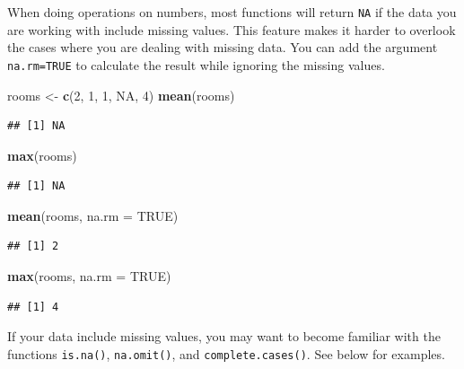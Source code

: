 \documentclass[]{book}
\newenvironment{Shaded}{\begin{snugshade}}{\end{snugshade}}
\newcommand{\KeywordTok}[1]{\textcolor[rgb]{0.13,0.29,0.53}{\textbf{#1}}}
\newcommand{\DataTypeTok}[1]{\textcolor[rgb]{0.13,0.29,0.53}{#1}}
\newcommand{\DecValTok}[1]{\textcolor[rgb]{0.00,0.00,0.81}{#1}}
\newcommand{\StringTok}[1]{\textcolor[rgb]{0.31,0.60,0.02}{#1}}
\newcommand{\OtherTok}[1]{\textcolor[rgb]{0.56,0.35,0.01}{#1}}
\newcommand{\NormalTok}[1]{#1}
\begin{document}
When doing operations on numbers, most functions will return \texttt{NA}
if the data you are working with include missing values. This feature
makes it harder to overlook the cases where you are dealing with missing
data. You can add the argument \texttt{na.rm=TRUE} to calculate the
result while ignoring the missing values.

\begin{Shaded}
\begin{Highlighting}[]
\NormalTok{rooms <-}\StringTok{ }\KeywordTok{c}\NormalTok{(}\DecValTok{2}\NormalTok{, }\DecValTok{1}\NormalTok{, }\DecValTok{1}\NormalTok{, }\OtherTok{NA}\NormalTok{, }\DecValTok{4}\NormalTok{)}
\KeywordTok{mean}\NormalTok{(rooms)}
\end{Highlighting}
\end{Shaded}

\begin{verbatim}
## [1] NA
\end{verbatim}

\begin{Shaded}
\begin{Highlighting}[]
\KeywordTok{max}\NormalTok{(rooms)}
\end{Highlighting}
\end{Shaded}

\begin{verbatim}
## [1] NA
\end{verbatim}

\begin{Shaded}
\begin{Highlighting}[]
\KeywordTok{mean}\NormalTok{(rooms, }\DataTypeTok{na.rm =} \OtherTok{TRUE}\NormalTok{)}
\end{Highlighting}
\end{Shaded}

\begin{verbatim}
## [1] 2
\end{verbatim}

\begin{Shaded}
\begin{Highlighting}[]
\KeywordTok{max}\NormalTok{(rooms, }\DataTypeTok{na.rm =} \OtherTok{TRUE}\NormalTok{)}
\end{Highlighting}
\end{Shaded}

\begin{verbatim}
## [1] 4
\end{verbatim}

If your data include missing values, you may want to become familiar
with the functions \texttt{is.na()}, \texttt{na.omit()}, and
\texttt{complete.cases()}. See below for examples.
\end{document}
